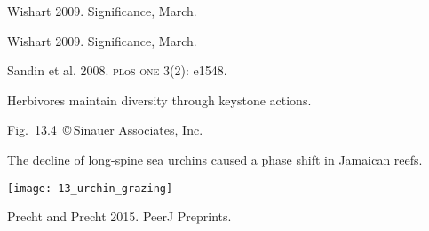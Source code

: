 \documentclass[t]{beamer}
\begin{document}
{
\begin{frame}[b]

	\hfill \tiny Wishart 2009. Significance, March.

\end{frame}
}

{
\begin{frame}[b]

	\hfill \tiny Wishart 2009. Significance, March.

\end{frame}
}

{
\begin{frame}[b]

	\hfill \tiny Sandin et al. 2008. \textsc{pl}o\textsc{s one} 3(2): e1548.

\end{frame}
}
%

{
\begin{frame}[b]{Herbivores maintain diversity through keystone actions.}

	\hfill \tiny Fig.~13.4~\copyright\,Sinauer Associates, Inc.

\end{frame}
}
%
\begin{frame}[t]{The decline of long-spine sea urchins caused a phase shift in Jamaican reefs.}

	\texttt{[image: 13\_urchin\_grazing]}
	
	\vfilll
	
	\hfill \tiny Precht and Precht 2015. PeerJ Preprints.

\end{frame}
\end{document}
